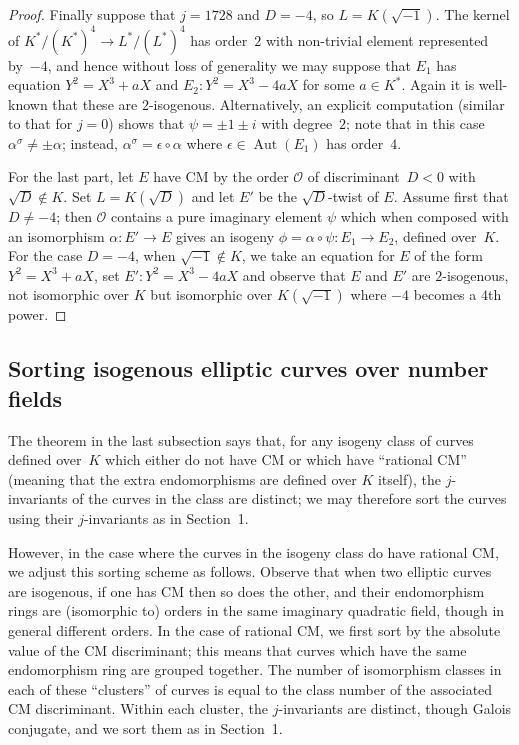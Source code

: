 \documentclass{article}
\def\OO{{\mathcal O}}
\DeclareMathOperator{\Aut}{Aut}
\begin{document}
\begin{proof}
Finally suppose that $j=1728$ and $D=-4$, so $L=K(\sqrt{-1})$.  The
kernel of $K^*/(K^*)^4 \to L^*/(L^*)^4$ has order~$2$ with non-trivial
element represented by~$-4$, and hence without loss of generality we
may suppose that $E_1$ has equation $Y^2=X^3+aX$ and $E_2:
Y^2=X^3-4aX$ for some $a\in K^*$.  Again it is well-known that these
are $2$-isogenous.  Alternatively, an explicit computation (similar to
that for $j=0$) shows that $\psi=\pm1\pm i$ with degree~$2$; note that
in this case $\alpha^{\sigma}\not=\pm\alpha$; instead,
$\alpha^{\sigma}=\epsilon\circ\alpha$ where $\epsilon\in\Aut(E_1)$ has
order~$4$.

For the last part, let $E$ have CM by the order $\OO$ of
discriminant~$D<0$ with $\sqrt{D}\notin K$.  Set $L=K(\sqrt{D})$ and
let $E'$ be the $\sqrt{D}$-twist of $E$.  Assume first that
$D\not=-4$; then $\OO$ contains a pure imaginary element $\psi$ which
when composed with an isomorphism $\alpha:E'\to E$ gives an isogeny
$\phi=\alpha\circ\psi:E_1\to E_2$, defined over~$K$.  For the case
$D=-4$, when $\sqrt{-1}\notin K$, we take an equation for $E$ of the
form $Y^2=X^3+aX$, set $E': Y^2=X^3-4aX$ and observe that $E$ and $E'$
are $2$-isogenous, not isomorphic over $K$ but isomorphic over
$K(\sqrt{-1})$ where $-4$ becomes a $4$th power.

\end{proof}

\subsection{Sorting isogenous elliptic curves over number fields}

The theorem in the last subsection says that, for any isogeny class of
curves defined over~$K$ which either do not have CM or which have
``rational CM'' (meaning that the extra endomorphisms are defined over
$K$ itself), the $j$-invariants of the curves in the class are
distinct; we may therefore sort the curves using their $j$-invariants
as in Section~1.

However, in the case where the curves in the isogeny class do have
rational CM, we adjust this sorting scheme as follows.  Observe that
when two elliptic curves are isogenous, if one has CM then so does the
other, and their endomorphism rings are (isomorphic to) orders in the
same imaginary quadratic field, though in general different orders.
In the case of rational CM, we first sort by the absolute value of the
CM discriminant; this means that curves which have the same
endomorphism ring are grouped together.  The number of isomorphism
classes in each of these ``clusters'' of curves is equal to the class
number of the associated CM discriminant.  Within each cluster, the
$j$-invariants are distinct, though Galois conjugate, and we sort them
as in Section~1.
\end{document}
